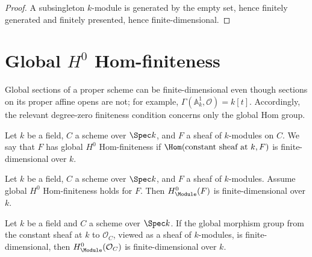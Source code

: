 \begin{proof}

  \leanok
  A subsingleton \(k\)-module is generated by the empty set, hence finitely generated and finitely presented, hence finite-dimensional.
\end{proof}


\section{Global \(H^0\) Hom-finiteness}
\label{sec:IsHModuleHomFinite_iter043}

Global sections of a proper scheme can be finite-dimensional even though sections on its proper affine opens are not; for example, \(\Gamma(\mathbb A^1_k,\mathcal O)=k[t]\). Accordingly, the relevant degree-zero finiteness condition concerns only the global Hom group.

\begin{definition}\leanok
  \label{thm:Scheme_IsHModuleHomFinite}

  Let \(k\) be a field, \(C\) a scheme over \(\Spec k\), and \(F\) a sheaf of \(k\)-modules on \(C\). We say that \(F\) has global \(H^0\) Hom-finiteness if \(\Hom(\text{constant sheaf at }k, F)\) is finite-dimensional over \(k\).
\end{definition}

\begin{theorem}\leanok
  \label{thm:Scheme_module_finite_HModule_zero_of_isHModuleHomFinite}
  Let \(k\) be a field, \(C\) a scheme over \(\Spec k\), and \(F\) a sheaf of \(k\)-modules. Assume global \(H^0\) Hom-finiteness holds for \(F\). Then \(H^0_{\Module}(F)\) is finite-dimensional over \(k\).
\end{theorem}

\begin{theorem}\leanok
  \label{thm:Scheme_module_finite_HModule_zero_of_isHModuleHomFinite_curve}
  Let \(k\) be a field and \(C\) a scheme over \(\Spec k\). If the global morphism group from the constant sheaf at \(k\) to \(\mathcal O_C\), viewed as a sheaf of \(k\)-modules, is finite-dimensional, then \(H^0_{\Module}(\mathcal O_C)\) is finite-dimensional over \(k\).
\end{theorem}

